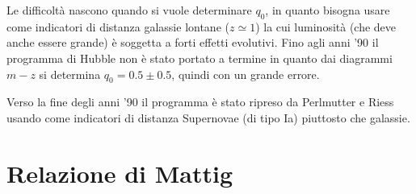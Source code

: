 Le difficoltà nascono quando si vuole determinare $q_0$, in quanto bisogna usare
come indicatori di distanza galassie lontane ($z \simeq 1$) la cui luminosità
(che deve anche essere grande) è soggetta a forti effetti evolutivi.  Fino agli
anni '90 il programma di Hubble non è stato portato a termine in quanto dai
diagrammi $m-z$ si determina $q_0 = 0.5 \pm 0.5$, quindi con un grande errore.

Verso la fine degli anni '90 il programma è stato ripreso da Perlmutter e Riess
usando come indicatori di distanza Supernovae (di tipo Ia) piuttosto che
galassie.

\section{Relazione di Mattig}

